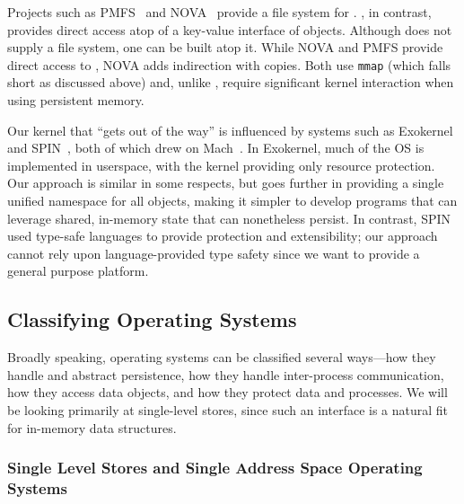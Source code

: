 Projects such as PMFS~\cite{dulloor:eurosys14} and
NOVA~\cite{Xu:nova} provide a file system for \NVM. \Twizzler, in
contrast, provides direct \NVM access atop of a key-value interface of objects.
Although \Twizzler does not supply a file system, one can be built
atop it. While NOVA
and PMFS provide direct access to \NVM, NOVA adds indirection
with copies. Both use \texttt{mmap} (which falls short as
discussed above) and, unlike \Twizzler, require significant kernel interaction
when using persistent memory.

Our kernel that ``gets out of the way'' is influenced by systems
such as Exokernel~\cite{engler:sosp95} and SPIN~\cite{bershad:sosp95}, both of
which drew on Mach~\cite{accetta:usenix86s}. In
Exokernel, much of the OS is implemented in userspace, with the kernel providing only resource protection. Our approach is
similar in some respects, but goes further in providing a single unified
namespace for all objects, making it simpler to develop programs
that can leverage shared, in-memory state that can nonetheless persist.
In contrast, SPIN used type-safe languages to provide protection and
extensibility; our approach cannot rely upon language-provided type safety since
we want to provide a general purpose platform.

\subsection{Classifying Operating Systems}
Broadly speaking, operating systems can be classified several ways---how they handle and abstract
persistence, how they handle inter-process communication, how they access data objects, and how they
protect data and processes. We will be looking
primarily at single-level stores, since such an interface is a natural fit for in-memory data structures.

\subsubsection{Single Level Stores and Single Address Space Operating Systems}
\label{sec:sasos}

